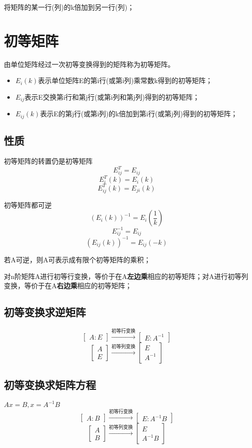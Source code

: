 将矩阵的某一行(列)的k倍加到另一行(列)；


\section{初等矩阵}
由单位矩阵经过一次初等变换得到的矩阵称为初等矩阵。
\begin{itemize}
    \item \(E_i(k)\)表示单位矩阵E的第i行(或第i列)乘常数k得到的初等矩阵；
    \item \(E_{ij}\)表示E交换第i行和第j行(或第i列和第j列)得到的初等矩阵；
    \item \(E_{ij}(k)\)表示E的第j行(或第i列)的k倍加到第i行(或第j列)得到的初等矩阵；
\end{itemize}


\subsection{性质}

初等矩阵的转置仍是初等矩阵
\[E_{ij}^T = E_{ij}\]
\[E_i^T(k) = E_i(k)\]
\[E_{ij}^T(k) = E_{ji}(k)\]

初等矩阵都可逆
\[(E_i(k))^{-1} = E_i(\frac{1}{k})\]
\[E_{ij}^{-1} = E_{ij}\]
\[(E_{ij}(k))^{-1} = E_{ij}(-k)\]

若A可逆，则A可表示成有限个初等矩阵的乘积；

对n阶矩阵A进行初等行变换，等价于在A\textbf{左边乘}相应的初等矩阵；对A进行初等列变换，等价于在A\textbf{右边乘}相应的初等矩阵；


\subsection{初等变换求逆矩阵}
\[\begin{bmatrix}
A:E
\end{bmatrix}
\xrightarrow{\text{初等行变换}}
\begin{bmatrix}
E:A^{-1}
\end{bmatrix}\]
\[\begin{bmatrix}
A \\ 
E
\end{bmatrix}
\xrightarrow{\text{初等列变换}}
\begin{bmatrix}
E \\ 
A^{-1}
\end{bmatrix}\]

\subsection{初等变换求矩阵方程}
\(Ax = B, x = A^{-1}B\)
\[\begin{bmatrix}
A:B
\end{bmatrix}
\xrightarrow{\text{初等行变换}}
\begin{bmatrix}
E:A^{-1}B
\end{bmatrix}\]
\[\begin{bmatrix}
A \\ 
B
\end{bmatrix}
\xrightarrow{\text{初等列变换}}
\begin{bmatrix}
E \\ 
A^{-1}B
\end{bmatrix}\]


